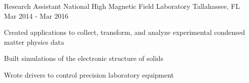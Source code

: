 \begin{cventries}
  \cventry
  {Research Assistant} %
  {National High Magnetic Field Laboratory} %
  {Tallahassee, FL} %
  {Mar 2014 - Mar 2016} %
  {
    \begin{cvitems} %
      \item {Created applications to collect, transform, and analyze experimental condensed matter physics data}
      \item {Built simulations of the electronic structure of solids}
      \item {Wrote drivers to control precision laboratory equipment}
    \end{cvitems}
  }

\end{cventries}
